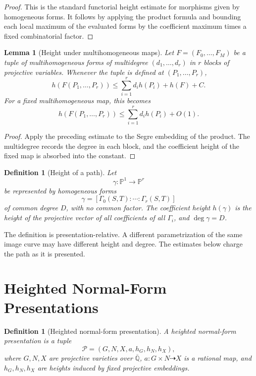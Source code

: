 \documentclass[11pt]{article}
\newtheorem{lemma}[theorem]{Lemma}
\newtheorem{definition}[theorem]{Definition}
\begin{document}
\begin{proof}
This is the standard functorial height estimate for morphisms given by homogeneous forms. It follows by applying the product formula and bounding each local maximum of the evaluated forms by the coefficient maximum times a fixed combinatorial factor.
\end{proof}

\begin{lemma}[Height under multihomogeneous maps]
Let \(F=(F_0,\ldots,F_M)\) be a tuple of multihomogeneous forms of multidegree \((d_1,\ldots,d_r)\) in \(r\) blocks of projective variables. Whenever the tuple is defined at \((P_1,\ldots,P_r)\),
\[
h(F(P_1,\ldots,P_r))
\leq
\sum_{i=1}^r d_i h(P_i)+h(F)+C.
\]
For a fixed multihomogeneous map, this becomes
\[
h(F(P_1,\ldots,P_r))
\leq
\sum_{i=1}^r d_i h(P_i)+O(1).
\]
\end{lemma}

\begin{proof}
Apply the preceding estimate to the Segre embedding of the product. The multidegree records the degree in each block, and the coefficient height of the fixed map is absorbed into the constant.
\end{proof}

\begin{definition}[Height of a path]
Let
\[
\gamma:\mathbb P^1\to\mathbb P^r
\]
be represented by homogeneous forms
\[
\gamma=[\Gamma_0(S,T):\cdots:\Gamma_r(S,T)]
\]
of common degree \(D\), with no common factor. The coefficient height \(h(\gamma)\) is the height of the projective vector of all coefficients of all \(\Gamma_i\), and \(\deg\gamma=D\).
\end{definition}

The definition is presentation-relative. A different parametrization of the same image curve may have different height and degree. The estimates below charge the path as it is presented.

\section{Heighted Normal-Form Presentations}

\begin{definition}[Heighted normal-form presentation]
A heighted normal-form presentation is a tuple
\[
\mathcal P=(G,N,X,a,h_G,h_N,h_X),
\]
where \(G,N,X\) are projective varieties over \(\overline{\mathbb Q}\), \(a:G\times N\dashrightarrow X\) is a rational map, and \(h_G,h_N,h_X\) are heights induced by fixed projective embeddings.
\end{definition}
\end{document}
